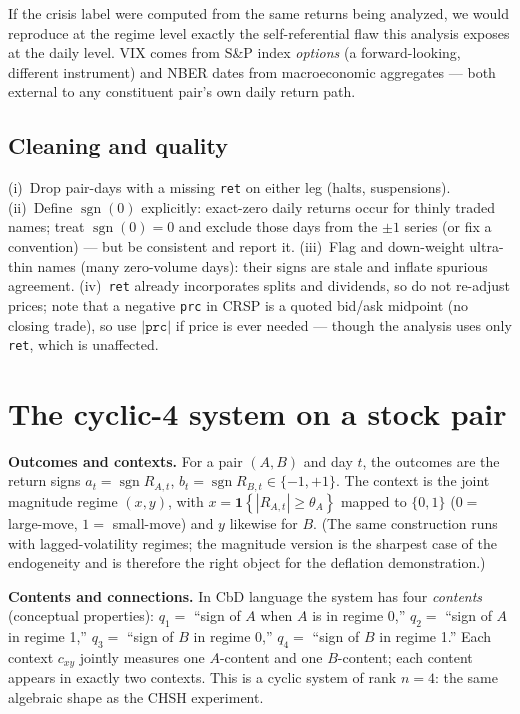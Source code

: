 \documentclass[11pt]{article}
\newcommand{\sgn}{\operatorname{sgn}}
\newcommand{\ind}[1]{\mathbf{1}\!\left\{#1\right\}}
\begin{document}
\begin{cautionbox}
If the crisis label were computed from the same returns being analyzed, we would reproduce at
the regime level exactly the self-referential flaw this analysis exposes at the daily level. VIX
comes from S\&P index \emph{options} (a forward-looking, different instrument) and NBER dates
from macroeconomic aggregates --- both external to any constituent pair's own daily return path.
\end{cautionbox}

\subsection{Cleaning and quality}
(i)~Drop pair-days with a missing \texttt{ret} on either leg (halts, suspensions).
(ii)~Define $\sgn(0)$ explicitly: exact-zero daily returns occur for thinly traded names; treat
$\sgn(0)=0$ and exclude those days from the $\pm1$ series (or fix a convention) --- but be
consistent and report it. (iii)~Flag and down-weight ultra-thin names (many zero-volume days):
their signs are stale and inflate spurious agreement. (iv)~\texttt{ret} already incorporates
splits and dividends, so do not re-adjust prices; note that a negative \texttt{prc} in CRSP is a
quoted bid/ask midpoint (no closing trade), so use $|\texttt{prc}|$ if price is ever needed ---
though the analysis uses only \texttt{ret}, which is unaffected.

\section{The cyclic-4 system on a stock pair}

\textbf{Outcomes and contexts.} For a pair $(A,B)$ and day $t$, the outcomes are the return
signs $a_t=\sgn R_{A,t}$, $b_t=\sgn R_{B,t}\in\{-1,+1\}$. The context is the joint magnitude
regime $(x,y)$, with $x=\ind{|R_{A,t}|\ge\theta_A}$ mapped to $\{0,1\}$ ($0=$ large-move,
$1=$ small-move) and $y$ likewise for $B$. (The same construction runs with lagged-volatility
regimes; the magnitude version is the sharpest case of the endogeneity and is therefore the
right object for the deflation demonstration.)

\textbf{Contents and connections.} In CbD language the system has four \emph{contents}
(conceptual properties): $q_1=$ ``sign of $A$ when $A$ is in regime 0,'' $q_2=$ ``sign of $A$
in regime 1,'' $q_3=$ ``sign of $B$ in regime 0,'' $q_4=$ ``sign of $B$ in regime 1.'' Each
context $c_{xy}$ jointly measures one $A$-content and one $B$-content; each content appears in
exactly two contexts. This is a cyclic system of rank $n=4$: the same algebraic shape as the
CHSH experiment.
\end{document}

